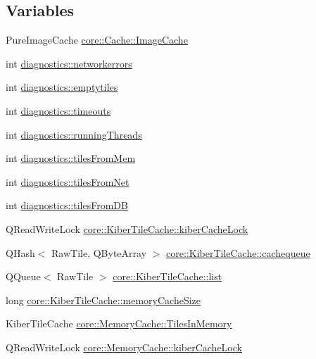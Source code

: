 \subsection*{\-Variables}
\begin{DoxyCompactItemize}
\item 
\-Pure\-Image\-Cache \hyperlink{group___o_p_map_widget_gab71cf242d304174673b1385ade1915bd}{core\-::\-Cache\-::\-Image\-Cache}
\item 
int \hyperlink{group___o_p_map_widget_ga818b2b21d317fac5193b04d2c0e32c82}{diagnostics\-::networkerrors}
\item 
int \hyperlink{group___o_p_map_widget_ga34fe3ec60c45212857e46367009f0729}{diagnostics\-::emptytiles}
\item 
int \hyperlink{group___o_p_map_widget_ga9f4f4d5bc0d01d665175028f4ea970c7}{diagnostics\-::timeouts}
\item 
int \hyperlink{group___o_p_map_widget_gae7dc693c162396310de691f67b4b0e99}{diagnostics\-::running\-Threads}
\item 
int \hyperlink{group___o_p_map_widget_gade3ce38dee3744ba9c72ca0dce86b0d4}{diagnostics\-::tiles\-From\-Mem}
\item 
int \hyperlink{group___o_p_map_widget_ga6750459fc54ae81a5870b841aff67c6c}{diagnostics\-::tiles\-From\-Net}
\item 
int \hyperlink{group___o_p_map_widget_ga1a83442bf140e95b84931d57cc849449}{diagnostics\-::tiles\-From\-D\-B}
\item 
\-Q\-Read\-Write\-Lock \hyperlink{group___o_p_map_widget_ga33731aa2cecd7ba1200e9871f3380308}{core\-::\-Kiber\-Tile\-Cache\-::kiber\-Cache\-Lock}
\item 
\-Q\-Hash$<$ \-Raw\-Tile, \-Q\-Byte\-Array $>$ \hyperlink{group___o_p_map_widget_ga632c3be1045d7e97d09885aba0c18100}{core\-::\-Kiber\-Tile\-Cache\-::cachequeue}
\item 
\-Q\-Queue$<$ \-Raw\-Tile $>$ \hyperlink{group___o_p_map_widget_ga097b545fed7bd5b8be78160165f4f6f5}{core\-::\-Kiber\-Tile\-Cache\-::list}
\item 
long \hyperlink{group___o_p_map_widget_gae96e4700fe984a52afd8c8016dc1295b}{core\-::\-Kiber\-Tile\-Cache\-::memory\-Cache\-Size}
\item 
\-Kiber\-Tile\-Cache \hyperlink{group___o_p_map_widget_gaeb53ae92c08d2646f4ecbcf764e7e226}{core\-::\-Memory\-Cache\-::\-Tiles\-In\-Memory}
\item 
\-Q\-Read\-Write\-Lock \hyperlink{group___o_p_map_widget_ga9c5f2537ff4510c8890590e73ea95b65}{core\-::\-Memory\-Cache\-::kiber\-Cache\-Lock}

\end{DoxyCompactItemize}
